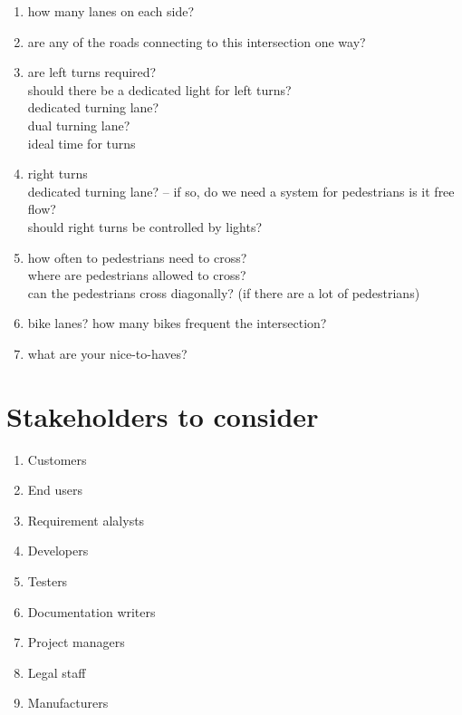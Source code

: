 \documentclass[letterpaper]{article}
\begin{document}
\begin{enumerate}
 \item how many lanes on each side?
 \item are any of the roads connecting to this intersection one way?
 \item are left turns required?\\
       should there be a dedicated light for left turns?\\
       dedicated turning lane?\\
       dual turning lane?\\
       ideal time for turns\\
 \item right turns\\
       dedicated turning lane? -- if so, do we need a system for pedestrians
       is it free flow?\\
       should right turns be controlled by lights?
 \item how often to pedestrians need to cross?\\
       where are pedestrians allowed to cross?\\
       can the pedestrians cross diagonally? (if there are a lot of pedestrians)
 \item bike lanes? how many bikes frequent the intersection?
       
       
       
       
 \item what are your nice-to-haves?
\end{enumerate}

\section{Stakeholders to consider}
\label{stakeholders}
\begin{enumerate}
 \item Customers
 \item End users
 \item Requirement alalysts
 \item Developers
 \item Testers
 \item Documentation writers
 \item Project managers
 \item Legal staff
 \item Manufacturers
\end{enumerate}
\end{document}
